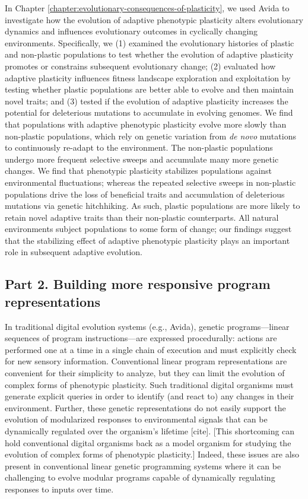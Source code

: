 In Chapter \ref{chapter:evolutionary-consequences-of-plasticity}, we used Avida to investigate how the evolution of adaptive phenotypic plasticity alters evolutionary dynamics and influences evolutionary outcomes in cyclically changing environments.
Specifically, we 
(1) examined the evolutionary histories of plastic and non-plastic populations to test whether the evolution of adaptive plasticity promotes or constrains subsequent evolutionary change;
(2) evaluated how adaptive plasticity influences fitness landscape exploration and exploitation by testing whether plastic populations are better able to evolve and then maintain novel traits;
and (3) tested if the evolution of adaptive plasticity increases the potential for deleterious mutations to accumulate in evolving genomes.
We find that populations with adaptive phenotypic plasticity evolve more slowly than non-plastic populations, which rely on genetic variation from \textit{de novo} mutations to continuously re-adapt to the environment.
The non-plastic populations undergo more frequent selective sweeps and accumulate many more genetic changes. %
We find that phenotypic plasticity stabilizes populations against environmental fluctuations; whereas the repeated selective sweeps in non-plastic populations drive the loss of beneficial traits and accumulation of deleterious mutations via genetic hitchhiking.  
As such, plastic populations are more likely to retain novel adaptive traits than their non-plastic counterparts. 
All natural environments subject populations to some form of change; our findings suggest that the stabilizing effect of adaptive phenotypic plasticity plays an important role in subsequent adaptive evolution.

\subsection{Part 2. Building more responsive program representations}

In traditional digital evolution systems (e.g., Avida), genetic programs---linear sequences of program instructions---are expressed procedurally: actions are performed one at a time in a single chain of execution and must explicitly check for new sensory information.
Conventional linear program representations are convenient for their simplicity to analyze, but they can limit the evolution of complex forms of phenotypic plasticity. 
Such traditional digital organisms must generate explicit queries in order to identify (and react to) any changes in their environment.
Further, these genetic representations do not easily support the evolution of modularized responses to environmental signals that can be dynamically regulated over the organism's lifetime [cite].
[This shortcoming can hold conventional digital organisms back as a model organism for studying the evolution of complex forms of phenotypic plasticity.]
Indeed, these issues are also present in conventional linear genetic programming systems where it can be challenging to evolve modular programs capable of dynamically regulating responses to inputs over time. 

